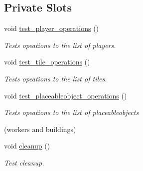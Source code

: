 \subsection*{Private Slots}
\begin{DoxyCompactItemize}
\item 
void \hyperlink{classdefault__objectmanager_aec7ac4004e9db71ce3b3437afa74dadf}{test\-\_\-player\-\_\-operations} ()
\begin{DoxyCompactList}\small\item\em Tests opeations to the list of players. \end{DoxyCompactList}\item 
void \hyperlink{classdefault__objectmanager_aab8dd175d96dfeba8c2220296e033dbd}{test\-\_\-tile\-\_\-operations} ()
\begin{DoxyCompactList}\small\item\em Tests opeations to the list of tiles. \end{DoxyCompactList}\item 
void \hyperlink{classdefault__objectmanager_a0ca24fa76077d630c473db1843412c43}{test\-\_\-placeableobject\-\_\-operations} ()
\begin{DoxyCompactList}\small\item\em Tests opeations to the list of placeableobjects \par
(workers and buildings) \end{DoxyCompactList}\item 
void \hyperlink{classdefault__objectmanager_a2ff9bd3c55983839dabc9ea9575990e0}{cleanup} ()
\begin{DoxyCompactList}\small\item\em Test cleanup. \end{DoxyCompactList}\end{DoxyCompactItemize}
